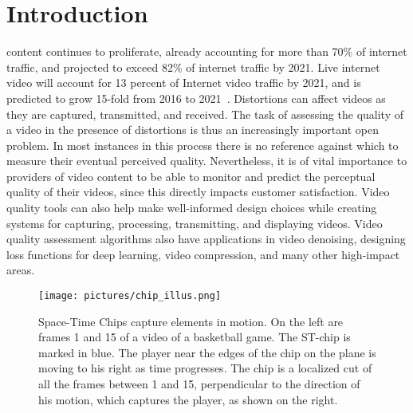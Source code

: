 \documentclass[journal]{IEEEtran}
\begin{document}
\IEEEpeerreviewmaketitle



\section{Introduction}
 content continues to proliferate, already accounting for more than 70\% of internet traffic, and projected to exceed 82\% of internet traffic by 2021. Live internet video will account for 13 percent of Internet video traffic by 2021, and is predicted to grow 15-fold from 2016 to 2021~\cite{cisco}.  Distortions can affect videos as they are captured, transmitted, and received. The task of assessing the quality of a video in the presence of distortions is thus an increasingly important open problem. In most instances in this process there is no reference against which to measure their eventual perceived quality. Nevertheless, it is of vital importance to providers of video content to be able to monitor and predict the perceptual quality of their videos, since this directly impacts customer satisfaction. Video quality tools can also help make well-informed design choices while creating systems for capturing, processing, transmitting, and displaying videos. Video quality assessment algorithms also have applications in video denoising, designing loss functions for deep learning, video compression, and many other high-impact areas.

\begin{figure}[!h] 
  \texttt{[image: pictures/chip\_illus.png]}
  \caption{Space-Time Chips capture elements in motion. On the left are frames 1 and 15 of a video of a basketball game. The ST-chip is marked in blue. The player near the edges of the chip on the  plane is moving to his right as time progresses. The chip is a localized cut of all the frames between 1 and 15, perpendicular to the direction of his motion, which captures the player, 
  as shown on the right.}\label{fig:chip_illus}
\vspace{-3mm}
\end{figure}
\end{document}
